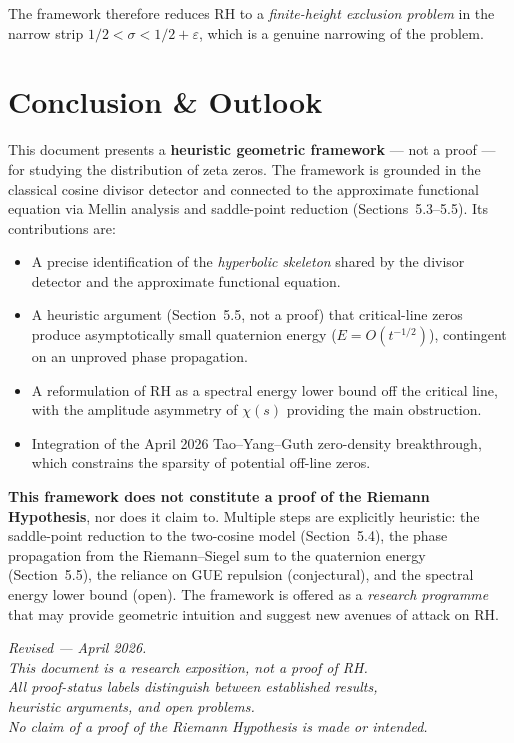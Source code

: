\documentclass[12pt,a4paper]{article}
\begin{document}
\medskip
\noindent The framework therefore reduces RH to a \emph{finite-height exclusion problem} in the narrow strip $1/2 < \sigma < 1/2 + \varepsilon$, which is a genuine narrowing of the problem.

\section*{Conclusion \& Outlook}

\begin{keypoint}
This document presents a \textbf{heuristic geometric framework} --- not a proof --- for studying the distribution of zeta zeros. The framework is grounded in the classical cosine divisor detector and connected to the approximate functional equation via Mellin analysis and saddle-point reduction (Sections~5.3--5.5). Its contributions are:
\begin{itemize}
\item A precise identification of the \emph{hyperbolic skeleton} shared by the divisor detector and the approximate functional equation.
\item A heuristic argument (Section~5.5, not a proof) that critical-line zeros produce asymptotically small quaternion energy ($E = O(t^{-1/2})$), contingent on an unproved phase propagation.
\item A reformulation of RH as a spectral energy lower bound off the critical line, with the amplitude asymmetry of $\chi(s)$ providing the main obstruction.
\item Integration of the April 2026 Tao--Yang--Guth zero-density breakthrough, which constrains the sparsity of potential off-line zeros.
\end{itemize}
\textbf{This framework does not constitute a proof of the Riemann Hypothesis}, nor does it claim to. Multiple steps are explicitly heuristic: the saddle-point reduction to the two-cosine model (Section~5.4), the phase propagation from the Riemann--Siegel sum to the quaternion energy (Section~5.5), the reliance on GUE repulsion (conjectural), and the spectral energy lower bound (open). The framework is offered as a \emph{research programme} that may provide geometric intuition and suggest new avenues of attack on RH.
\end{keypoint}

\begin{center}
\textit{Revised --- April 2026.\\
This document is a research exposition, not a proof of RH.\\
All proof-status labels distinguish between established results,\\
heuristic arguments, and open problems.\\
No claim of a proof of the Riemann Hypothesis is made or intended.}
\end{center}
\end{document}

